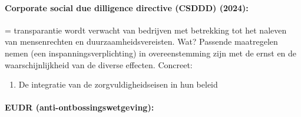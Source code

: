 \documentclass[12pt]{article}
\begin{document}
\paragraph{ Corporate social due dilligence directive (CSDDD) (2024):}
= transparantie wordt verwacht van bedrijven met betrekking tot het naleven van mensenrechten en duurzaamheidsvereisten. Wat? Passende maatregelen nemen (een inspanningsverplichting) in overeenstemming zijn met de ernst en de waarschijnlijkheid van de diverse effecten.
Concreet:\begin{enumerate}
    \item De integratie van de zorgvuldigheidseisen in hun beleid 
\end{enumerate}
\paragraph{EUDR (anti-ontbossingswetgeving):}
\end{document}
